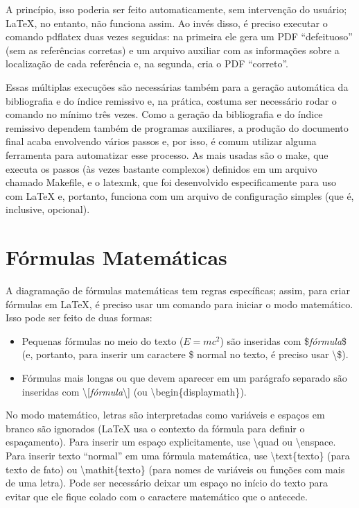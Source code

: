 A princípio, isso poderia ser feito automaticamente, sem intervenção do
usuário; \LaTeX{}, no entanto, não funciona assim. Ao invés disso, é
preciso executar o comando \textsf{pdflatex} duas vezes seguidas: na
primeira ele gera um PDF ``defeituoso'' (sem as referências corretas) e
um arquivo auxiliar com as informações sobre a localização de cada
referência e, na segunda, cria o PDF ``correto''.

Essas múltiplas execuções são necessárias também para a geração automática
da bibliografia e do índice remissivo e, na prática, costuma ser necessário
rodar o comando no mínimo três vezes. Como a geração da bibliografia e do
índice remissivo dependem também de programas auxiliares, a produção do
documento final acaba envolvendo vários passos e, por isso, é comum utilizar
alguma ferramenta para automatizar esse processo. As mais usadas são o
\textsf{make}, que executa os passos (às vezes bastante complexos) definidos
em um arquivo chamado \textsf{Makefile}, e o \textsf{latexmk}, que foi
desenvolvido especificamente para uso com \LaTeX{} e, portanto, funciona
com um arquivo de configuração simples (que é, inclusive, opcional).

\section{Fórmulas Matemáticas}

A diagramação de fórmulas matemáticas tem regras específicas; assim, para
criar fórmulas em \LaTeX{}, é preciso usar um comando para iniciar o modo
matemático. Isso pode ser feito de duas formas:

\begin{itemize}
  \item Pequenas fórmulas no meio do texto ($E=mc^2$) são inseridas com
  \textsf{\$\textit{fórmula}\$} (e, portanto, para inserir um caractere \$
  normal no texto, é preciso usar \textsf{\textbackslash{}\$}).

  \item Fórmulas mais longas ou que devem aparecer em um parágrafo
  separado são inseridas com
  \textsf{\textbackslash{}[\textit{fórmula}\textbackslash{}]} (ou
  \textsf{\textbackslash{}begin\{displaymath\}}).
\end{itemize}

No modo matemático, letras são interpretadas como variáveis e espaços
em branco são ignorados (\LaTeX{} usa o contexto da fórmula para
definir o espaçamento). Para inserir um espaço explicitamente, use
\textsf{\textbackslash{}quad} ou \textsf{\textbackslash{}enspace}.
Para inserir texto ``normal'' em uma fórmula matemática, use
\textsf{\textbackslash{}text\{texto\}} (para texto de fato) ou
\textsf{\textbackslash{}mathit\{texto\}} (para nomes de variáveis
ou funções com mais de uma letra). Pode ser necessário deixar um
espaço no início do texto para evitar que ele fique colado com o
caractere matemático que o antecede.

